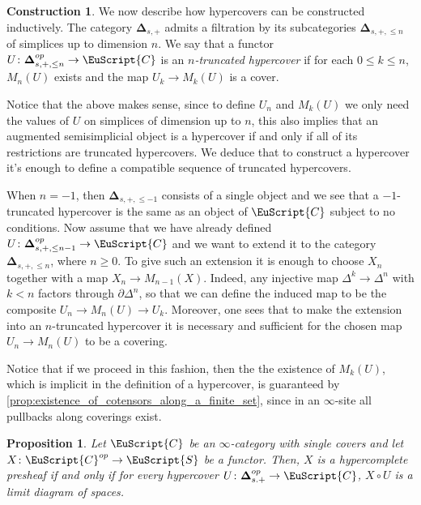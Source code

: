 \documentclass[oneside,a4paper]{amsart}
\newcommand{\euscr}[1]{\EuScript{#1}} %
\newcommand{\ccat}{\euscr{C}} %
\newcommand{\spaces}{\euscr{S}} %
\newcommand{\thickdelta}{\mathbf{\Delta}} %
\theoremstyle{plain}
\newtheorem{prop}[thm]{Proposition}
\theoremstyle{definition}
\newtheorem{construction}[thm]{Construction}
\theoremstyle{remark}
\begin{document}
\begin{construction}
\label{construction:hypercover}
We now describe how hypercovers can be constructed inductively. The category $\thickdelta_{s, +}$ admits a filtration by its subcategories $\thickdelta_{s, +, \leq n}$ of simplices up to dimension $n$. We say that a functor $U \colon \thickdelta_{s, +, \leq n}^{op} \rightarrow \ccat$ is an \emph{$n$-truncated hypercover} if for each $0 \leq k \leq n$, $M_{n}(U)$ exists and the map $U_{k} \rightarrow M_{k}(U)$ is a cover. 

Notice that the above makes sense, since to define $U_{n}$ and $M_{k}(U)$ we only need the values of $U$ on simplices of dimension up to $n$, this also implies that an augmented semisimplicial object is a hypercover if and only if all of its restrictions are truncated hypercovers. We deduce that to construct a hypercover it's enough to define a compatible sequence of truncated hypercovers. 

When $n=-1$, then $\thickdelta_{s, +, \leq -1}$ consists of a single object and we see that a $-1$-truncated hypercover is the same as an object of $\ccat$ subject to no conditions. Now assume that we have already defined $U \colon \thickdelta_{s, +, \leq n-1}^{op} \rightarrow \ccat$ and we want to extend it to the category $\thickdelta_{s, +, \leq n}$, where $n \geq 0$. To give such an extension it is enough to choose $X_{n}$ together with a map $X_{n} \rightarrow M_{n-1}(X)$. Indeed, any injective map $\Delta^{k} \rightarrow \Delta^{n}$ with $k < n$ factors through $\partial \Delta^{n}$, so that we can define the induced map to be the composite $U_{n} \rightarrow M_{n}(U) \rightarrow U_{k}$. Moreover, one sees that to make the extension into an $n$-truncated hypercover it is necessary and sufficient for the chosen map $U_{n} \rightarrow M_{n}(U)$ to be a covering.

Notice that if we proceed in this fashion, then the the existence of $M_{k}(U)$, which is implicit in the definition of a hypercover, is guaranteed by \cref{prop:existence_of_cotensors_along_a_finite_set}, since in an $\infty$-site all pullbacks along coverings exist. 
\end{construction}

\begin{prop}
\label{prop:recognition_of_hypercomplete_sheaves}
Let $\ccat$ be an $\infty$-category with single covers and let $X \colon \ccat^{op} \rightarrow \spaces$ be a functor. Then, $X$ is a hypercomplete presheaf if and only if for every hypercover $U \colon \thickdelta_{s. +}^{op} \rightarrow \ccat$, $X \circ U$ is a limit diagram of spaces. 
\end{prop}
\end{document}
